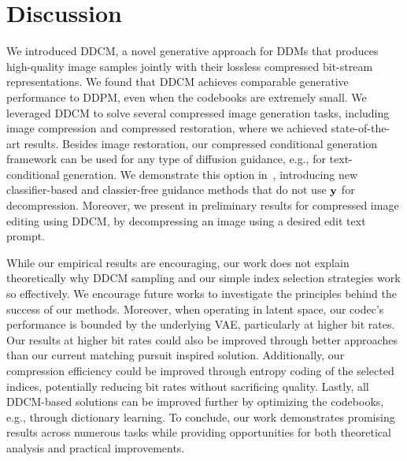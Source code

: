 \section{Discussion}\label{sec:discussion}

We introduced DDCM, a novel generative approach for DDMs that produces high-quality image samples jointly with their lossless compressed bit-stream representations.
We found that DDCM achieves comparable generative performance to DDPM, even when the codebooks are extremely small.
We leveraged DDCM to solve several compressed image generation tasks, including image compression and compressed restoration, where we achieved state-of-the-art results.
Besides image restoration, our compressed conditional generation framework can be used for any type of diffusion guidance, e.g., for text-conditional generation.
We demonstrate this option in~, introducing new classifier-based and classier-free guidance methods that do not use ${\mathbf{y}}$ for decompression.
Moreover, we present in  preliminary results for compressed image editing using DDCM, by decompressing an image using a desired edit text prompt.

While our empirical results are encouraging, our work does not explain theoretically why DDCM sampling and our simple index selection strategies work so effectively.
We encourage future works to investigate the principles behind the success of our methods.
Moreover, when operating in latent space, our codec's performance is bounded by the underlying VAE, particularly at higher bit rates.
Our results at higher bit rates could also be improved through better approaches than our current matching pursuit inspired solution.
Additionally, our compression efficiency could be improved through entropy coding of the selected indices, potentially reducing bit rates without sacrificing quality.
Lastly, all DDCM-based solutions can be improved further by optimizing the codebooks, e.g., through dictionary learning. 
To conclude, our work demonstrates promising results across numerous tasks while providing opportunities for both theoretical analysis and practical improvements.

